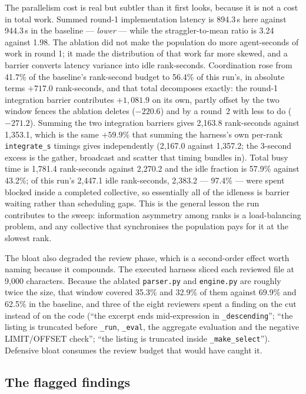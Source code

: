 \documentclass[11pt]{article}
\begin{document}
The parallelism cost is real but subtler than it first looks, because it is not a cost in total
work. Summed round-1 implementation latency is 894.3\,s here against 944.3\,s in the baseline
--- \emph{lower} --- while the straggler-to-mean ratio is 3.24 against 1.98. The ablation did
not make the population do more agent-seconds of work in round 1; it made the distribution of
that work far more skewed, and a barrier converts latency variance into idle rank-seconds.
Coordination rose from 41.7\% of the baseline's rank-second budget to 56.4\% of this run's, in
absolute terms $+717.0$ rank-seconds, and that total decomposes exactly: the round-1 integration
barrier contributes $+1{,}081.9$ on its own, partly offset by the two window fences the ablation
deletes ($-220.6$) and by a round~2 with less to do ($-271.2$). Summing the two integration
barriers gives 2{,}163.8 rank-seconds against 1{,}353.1, which is the same $+59.9$\% that
summing the harness's own per-rank \texttt{integrate\_s} timings gives independently (2{,}167.0
against 1{,}357.2; the 3-second excess is the gather, broadcast and scatter that timing bundles
in). Total busy time is 1{,}781.4
rank-seconds against 2{,}270.2 and the idle fraction is 57.9\% against 43.2\%; of this run's
2{,}447.1 idle rank-seconds, 2{,}383.2 --- 97.4\% --- were spent blocked inside a completed
collective, so essentially all of the idleness is barrier waiting rather than scheduling gaps.
This is the general lesson the run contributes to the sweep: information asymmetry among
ranks is a load-balancing problem, and any collective that synchronises the population pays for
it at the slowest rank.

The bloat also degraded the review phase, which is a second-order effect worth naming because it
compounds. The executed harness sliced each reviewed file at 9{,}000 characters. Because the
ablated \texttt{parser.py} and \texttt{engine.py} are roughly twice the size, that window covered
35.3\% and 32.9\% of them against 69.9\% and 62.5\% in the baseline, and three of the eight
reviewers spent a finding on the cut instead of on the code (``the excerpt ends mid-expression in
\texttt{\_descending}''; ``the listing is truncated before \texttt{\_run}, \texttt{\_eval}, the
aggregate evaluation and the negative LIMIT/OFFSET check''; ``the listing is truncated inside
\texttt{\_make\_select}''). Defensive bloat consumes the review budget that would have caught it.

\subsection{The flagged findings}
\end{document}
